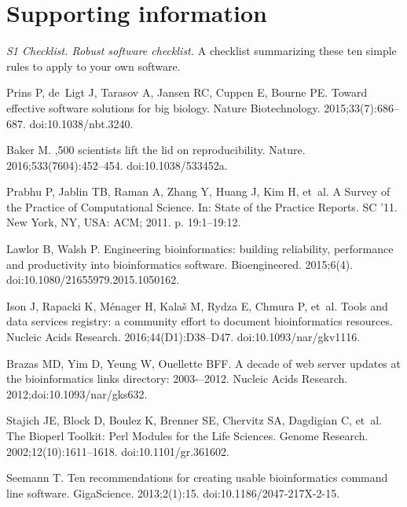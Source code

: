 \documentclass[10pt,letterpaper]{article}
\begin{document}
\section*{Supporting information}

\emph{S1 Checklist. Robust software checklist.} A checklist summarizing these ten simple rules to apply to your own
software.

\begin{thebibliography}{10}

Prins P, de~Ligt J, Tarasov A, Jansen RC, Cuppen E, Bourne PE.
\newblock Toward effective software solutions for big biology.
\newblock Nature Biotechnology. 2015;33(7):686--687.
\newblock doi:{10.1038/nbt.3240}.

Baker M.
,500 scientists lift the lid on reproducibility.
\newblock Nature. 2016;533(7604):452--454.
\newblock doi:{10.1038/533452a}.

Prabhu P, Jablin TB, Raman A, Zhang Y, Huang J, Kim H, et~al.
\newblock A Survey of the Practice of Computational Science.
\newblock In: State of the Practice Reports. SC '11. New York, NY, USA: ACM;
  2011. p. 19:1--19:12.

Lawlor B, Walsh P.
\newblock Engineering bioinformatics: building reliability, performance and
  productivity into bioinformatics software.
\newblock Bioengineered. 2015;6(4).
\newblock doi:{10.1080/21655979.2015.1050162}.

Ison J, Rapacki K, Ménager H, Kalaš M, Rydza E, Chmura P, et~al.
\newblock Tools and data services registry: a community effort to document
  bioinformatics resources.
\newblock Nucleic Acids Research. 2016;44(D1):D38--D47.
\newblock doi:{10.1093/nar/gkv1116}.

Brazas MD, Yim D, Yeung W, Ouellette BFF.
\newblock A decade of web server updates at the bioinformatics links directory:
  2003-–2012.
\newblock Nucleic Acids Research. 2012;doi:{10.1093/nar/gks632}.

Stajich JE, Block D, Boulez K, Brenner SE, Chervitz SA, Dagdigian C, et~al.
\newblock The Bioperl Toolkit: Perl Modules for the Life Sciences.
\newblock Genome Research. 2002;12(10):1611--1618.
\newblock doi:{10.1101/gr.361602}.

Seemann T.
\newblock Ten recommendations for creating usable bioinformatics command line
  software.
\newblock GigaScience. 2013;2(1):15.
\newblock doi:{10.1186/2047-217X-2-15}.


\end{thebibliography}
\end{document}
